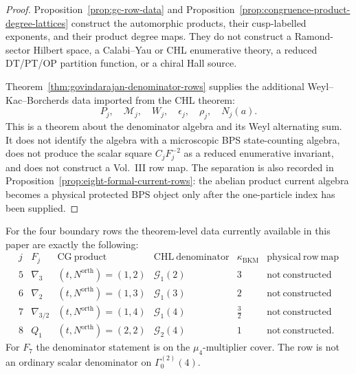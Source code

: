 \begin{proof}
Proposition~\ref{prop:gc-row-data} and
Proposition~\ref{prop:congruence-product-degree-lattices} construct the
automorphic products, their cusp-labelled exponents, and their product
degree maps.  They do not construct a Ramond-sector Hilbert space, a
Calabi--Yau or CHL enumerative theory, a reduced DT/PT/OP partition
function, or a chiral Hall source.

Theorem~\ref{thm:govindarajan-denominator-rows} supplies the
additional Weyl--Kac--Borcherds data imported from the CHL theorem:
$$
P_j,\quad \mathcal M_j,\quad W_j,\quad \epsilon_j,\quad
\rho_j,\quad N_j(a).
$$
This is a theorem about the denominator algebra and its Weyl alternating
sum.  It does not identify the algebra with a microscopic BPS
state-counting algebra, does not produce the scalar square
$C_jF_j^{-2}$ as a reduced enumerative invariant, and does not construct
a Vol.~III row map.  The separation is also recorded in
Proposition~\ref{prop:eight-formal-current-rows}: the abelian product current
algebra becomes a physical protected BPS object only after the
one-particle index has been supplied.
\end{proof}

\begin{theorem}
For the four boundary rows the theorem-level data currently available in
this paper are exactly the following:
$$
\begin{array}{c|c|c|c|c|c}
j&F_j&\mathrm{CG\ product}&\mathrm{CHL\ denominator}
&\kappa_{\mathrm{BKM}}&\mathrm{physical\ row\ map}\\ \hline
5&\nabla_3&(t,N^{\mathrm{orth}})=(1,2)&\mathcal G_1(2)&3&
\mathrm{not\ constructed}\\
6&\nabla_2&(t,N^{\mathrm{orth}})=(1,3)&\mathcal G_1(3)&2&
\mathrm{not\ constructed}\\
7&\nabla_{3/2}&(t,N^{\mathrm{orth}})=(1,4)&\mathcal G_1(4)&\frac32&
\mathrm{not\ constructed}\\
8&Q_1&(t,N^{\mathrm{orth}})=(2,2)&\mathcal G_2(4)&1&
\mathrm{not\ constructed}.
\end{array}
$$
For $F_7$ the denominator statement is on the $\mu_4$-multiplier cover.
The row is not an ordinary scalar denominator on $\Gamma_0^{(2)}(4)$.
\end{theorem}

